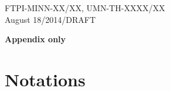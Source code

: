 \documentclass[epsfig,12pt]{article}
\begin{document}
\begin{titlepage}


\begin{flushright}
FTPI-MINN-XX/XX, UMN-TH-XXXX/XX\\
August 18/2014/DRAFT
\end{flushright}

\vspace{1.0cm}

\begin{center}
{  \Large \bf  Appendix only}
\end{center}


\end{titlepage}

\newpage
\appendix
\setcounter{equation}{0}


\section{Notations}
\label{app:notations}


\end{document}
